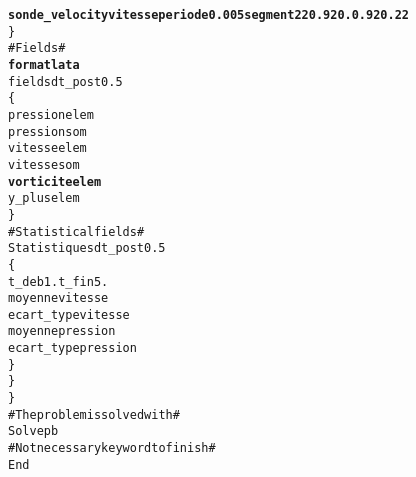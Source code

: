 \begin{alltt}
            {\bf{sonde_velocity  vitesse    periode 0.005   segment 22 0.92 0. 0.92 0.22 }}
        \} 
        # Fields # 
        {\bf{format lata }}
        fields dt_post 0.5 
        \{ 
            pression elem 
            pression som 
            vitesse elem 
            vitesse som 
            {\bf{vorticite elem}}
            y_plus elem 
        \} 
        # Statistical fields # 
        Statistiques dt_post 0.5 
        \{ 
            t_deb 1. t_fin 5. 
            moyenne vitesse 
            ecart_type vitesse 
            moyenne pression 
            ecart_type pression 
        \} 
    \}  
\} 
# The problem is solved with # 
Solve pb 
# Not necessary keyword to finish # 
End 
\end{alltt}
